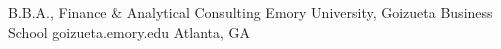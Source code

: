 

\begin{cventries}

  \cventry
    {B.B.A., Finance \& Analytical Consulting} %
    {Emory University, Goizueta Business School} %
    {goizueta.emory.edu} %
    {Atlanta, GA} %
    {}
\end{cventries}
